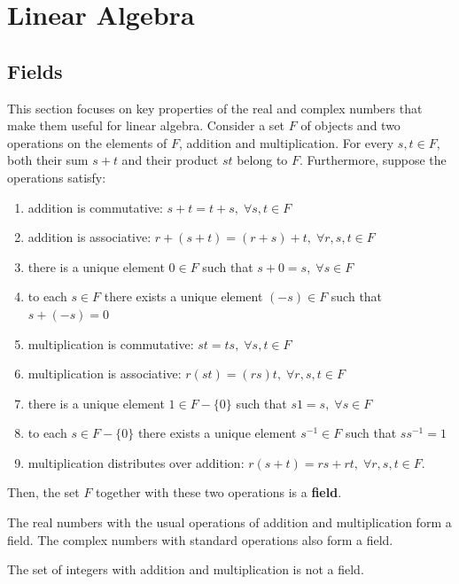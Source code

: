 \chapter{Linear Algebra}

\section{Fields}

This section focuses on key properties of the real and complex numbers that make them useful for linear algebra.
Consider a set $F$ of objects and two operations on the elements of $F$, addition and multiplication.
For every $s,t\in F$, both their sum $s+t$ and their product $st$ belong to $F$.
Furthermore, suppose the operations satisfy:
\begin{enumerate}
\item addition is commutative: $s + t = t + s, \; \forall s, t \in F$
\item addition is associative: $r + (s + t) = (r + s) + t, \; \forall r, s, t \in F$
\item there is a unique element $0 \in F$ such that $s + 0 = s, \; \forall s \in F$
\item to each $s \in F$ there exists a unique element $(-s) \in F$ such that $s + (-s) = 0$
\item multiplication is commutative: $st = ts, \; \forall s,t \in F$
\item multiplication is associative: $r(st) = (rs)t, \; \forall r, s, t \in F$
\item there is a unique element $1 \in F - \{0\}$ such that $s1 = s, \; \forall s \in F$
\item to each $s \in F - \{0\}$ there exists a unique element $s^{-1} \in F$ such that $s s^{-1} = 1$
\item multiplication distributes over addition: $r (s + t) = rs + rt, \; \forall r, s, t \in F$.
\end{enumerate}
Then, the set $F$ together with these two operations is a \textbf{field}.

\begin{example}
The real numbers with the usual operations of addition and multiplication form a field.
The complex numbers with standard operations also form a field.
\end{example}

\begin{example}
The set of integers with addition and multiplication is not a field.
\end{example}

